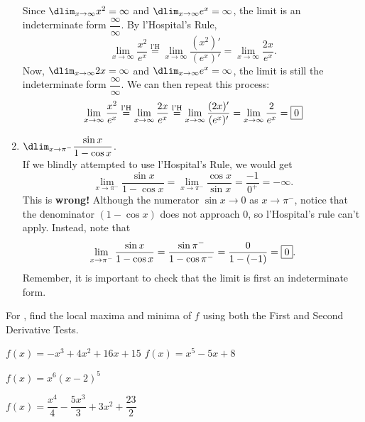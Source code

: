\documentclass{book}
\newcommand{\lHeq}{\overset{\text{l'H}}{=}}
\begin{document}
\begin{Exam}
\begin{enumerate}
Since $\dlim_{x\to \infty} x^2 = \infty$ and $\dlim_{x\to \infty} e^x = \infty$, the limit is an indeterminate form $\dfrac{\infty}{\infty}$. By l'Hospital's Rule, \[\lim_{x\to \infty} \dfrac{x^2}{e^x} \lHeq \lim_{x\to \infty} \dfrac{(x^2)'}{(e^x)'} = \lim_{x\to \infty} \dfrac{2x}{e^x}.\] Now, $\dlim_{x\to \infty} 2x = \infty$ and $\dlim_{x\to \infty} e^x = \infty$, the limit is still the indeterminate form $\dfrac{\infty}{\infty}$. We can then repeat this process:
\[\lim_{x\to \infty} \dfrac{x^2}{e^x} \lHeq \lim_{x\to \infty} \dfrac{2x}{e^x} \lHeq \lim_{x\to \infty} \dfrac{(2x)'}{(e^x)'} = \lim_{x\to \infty} \dfrac{2}{e^x} = \fbox{$0$}\] 

\item $\dlim_{x\to\pi^-} \dfrac{\sin x}{1-\cos x}$.\\

If we blindly attempted to use l'Hospital's Rule, we would get \[\lim_{x\to \pi^-}\dfrac{\sin x}{1-\cos x} = \lim_{x\to \pi^-} \dfrac{\cos x}{\sin x} = \dfrac{-1}{0^+} = -\infty.\] This is \textbf{wrong!} Although the numerator $\sin x \to 0$ as $x\to \pi^-$, notice that the denominator $(1-\cos x)$ does not approach $0$, so l'Hospital's rule can't apply. Instead, note that \[\lim_{x\to \pi^-} \dfrac{\sin x}{1-\cos x} = \dfrac{\sin \pi^-}{1 -\cos \pi^-} = \dfrac{0}{1-(-1)} = \fbox{0}.\] Remember, it is important to check that the limit is first an indeterminate form.
\end{enumerate}
\end{Exam}


\vfill
{}
\pagebreak

For , find the local maxima and minima of $f$ using both the First and Second Derivative Tests.
\begin{enumerate}[!HW!]
\begin{multicols}{2}
\item\label{exer:secondderivativetest:start} $f(x) = -x^{3} + 4x^2 + 16x + 15$ 
\itemspade $f(x)=x^5-5x+8$ 
\end{multicols}
\begin{multicols}{2}
\itemspade $f(x)=x^6(x-2)^5$ 
\item\label{exer:secondderivativetest:stop} $f(x) = \dfrac{x^{4}}{4} - \dfrac{5x^{3}}{3} + 3x^{2} + \dfrac{23}{2}$
\end{multicols}
\end{enumerate}
\end{document}
